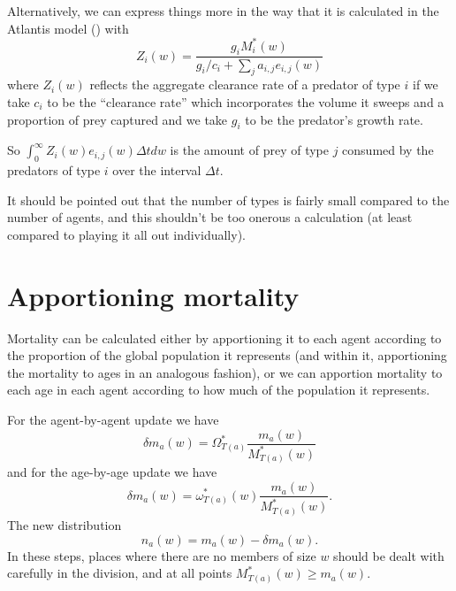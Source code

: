 Alternatively, we can express things more in the way that it is
calculated in the Atlantis model (\cite{Fulton2011pcomm}) with
\[ Z_i (w) = \frac{g_i M^{\ast}_i (w)}{g_i / c_i + \sum_j a_{i,j} e_{i,j} (w)}
\]
where $Z_i (w)$ reflects the aggregate clearance rate of a predator of type
$i$ if we take $c_i$ to be the ``clearance rate'' which incorporates the
volume it sweeps and a proportion of prey captured and we take $g_i$ to be the
predator's growth rate.

So $\int_0^{\infty} Z_i (w) e_{i,j} (w) \Delta t d w$ is the amount of prey of
type $j$ consumed by the predators of type $i$ over the interval $\Delta t$.



It should be pointed out that the number of types is fairly small compared to
the number of agents, and this shouldn't be too onerous a calculation (at
least compared to playing it all out individually).

\section{Apportioning mortality}

Mortality can be calculated either by apportioning it to each agent according
to the proportion of the global population it represents (and within it,
apportioning the mortality to ages in an analogous fashion), or we can
apportion mortality to each age in each agent according to how much of the
population it represents.

For the agent-by-agent update we have
\[ \delta m_a (w) = \Omega^{\ast}_{T (a)}  \frac{m_a (w)}{M^{\ast}_{T (a)}
   (w)} \]
and for the age-by-age update we have
\[ \delta m_a (w) = \omega^{\ast}_{T (a)} (w)  \frac{m_a (w)}{M^{\ast}_{T (a)}
   (w)} . \]
The new distribution
\[ n_a (w) = m_a (w) - \delta m_a (w) . \]
In these steps, places where there are no members of size $w$ should be dealt
with carefully in the division, and at all points $M^{\ast}_{T (a)} (w)
\geqslant m_a (w)$.
